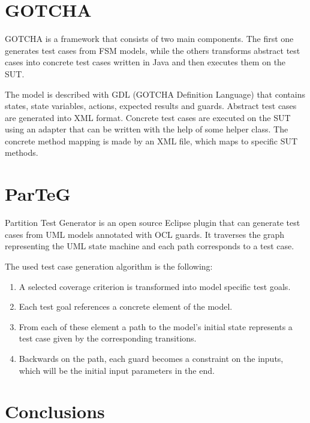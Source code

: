 
\section{GOTCHA}
\label{sec:gotcha}

GOTCHA \cite{gotcha} is a framework that consists of two main components. The first one generates test cases from FSM models, while the others transforms abstract test cases into concrete test cases written in Java and then executes them on the SUT.

The model is described with GDL (GOTCHA Definition Language) that contains states, state variables, actions, expected results and guards. Abstract test cases are generated into XML format. Concrete test cases are executed on the SUT using an adapter that can be written with the help of some helper class. The concrete method mapping is made by an XML file, which maps to specific SUT methods.


\section{ParTeG}
\label{sec:parteg}

Partition Test Generator \cite{parteg}\cite{partegweb} is an open source Eclipse plugin that can generate test cases from UML models annotated with OCL guards. It traverses the graph representing the UML state machine and each path corresponds to a test case.

The used test case generation algorithm is the following:

\begin{enumerate}
	\item A selected coverage criterion is transformed into model specific test goals.
	\item Each test goal references a concrete element of the model.
	\item From each of these element a path to the model's initial state represents a test case given by the corresponding transitions.
	\item Backwards on the path, each guard becomes a constraint on the inputs, which will be the initial input parameters in the end.
\end{enumerate}


\section{Conclusions}
\label{sec:conclusions}

